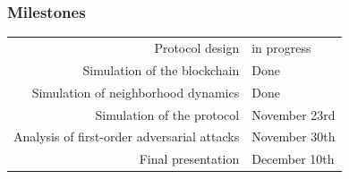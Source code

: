 \documentclass{beamer}
\begin{document}
\begin{frame}
	\frametitle{Milestones}
	\begin{tabular}{r l}
		Protocol design & in progress \\
		Simulation of the blockchain & Done \\
		Simulation of neighborhood dynamics & Done \\
		Simulation of the protocol & November 23rd \\ %
		Analysis of first-order adversarial attacks & November 30th \\
		Final presentation & December 10th \\
	\end{tabular}
\end{frame}
\end{document}
